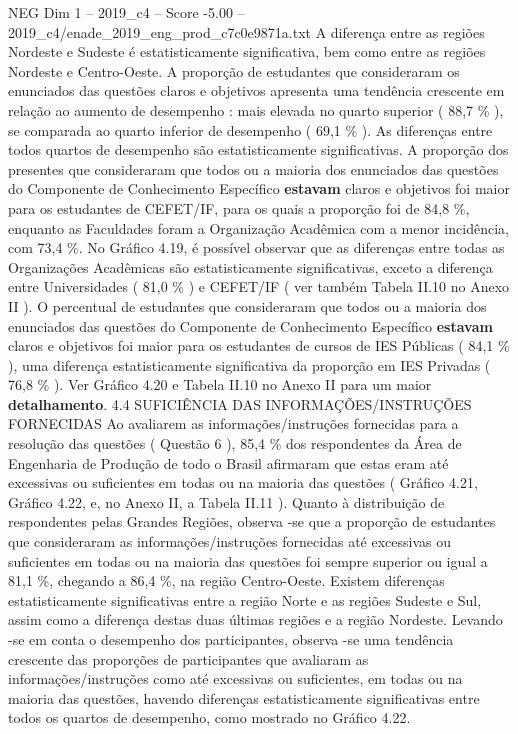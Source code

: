 \begin{textsample}{NEG Dim 1 – 2019\_c4 – Score -5.00 – 2019\_c4/enade\_2019\_eng\_prod\_c7c0e9871a.txt}
A diferença entre as regiões Nordeste e Sudeste é estatisticamente significativa, bem como entre as regiões Nordeste e Centro-Oeste.
A proporção de estudantes que consideraram os enunciados das questões claros e objetivos apresenta uma tendência crescente em relação ao aumento de desempenho : mais elevada no quarto superior ( 88,7 \% ), se comparada ao quarto inferior de desempenho ( 69,1 \% ).
As diferenças entre todos quartos de desempenho são estatisticamente significativas.
A proporção dos presentes que consideraram que todos ou a maioria dos enunciados das questões do Componente de Conhecimento Específico \textbf{estavam} claros e objetivos foi maior para os estudantes de CEFET/IF, para os quais a proporção foi de 84,8 \%, enquanto as Faculdades foram a Organização Acadêmica com a menor incidência, com 73,4 \%.
No Gráfico 4.19, é possível observar que as diferenças entre todas as Organizações Acadêmicas são estatisticamente significativas, exceto a diferença entre Universidades ( 81,0 \% ) e CEFET/IF ( ver também Tabela II.10 no Anexo II ).
O percentual de estudantes que consideraram que todos ou a maioria dos enunciados das questões do Componente de Conhecimento Específico \textbf{estavam} claros e objetivos foi maior para os estudantes de cursos de IES Públicas ( 84,1 \% ), uma diferença estatisticamente significativa da proporção em IES Privadas ( 76,8 \% ).
Ver Gráfico 4.20 e Tabela II.10 no Anexo II para um maior \textbf{detalhamento}. 4.4 SUFICIÊNCIA DAS INFORMAÇÕES/INSTRUÇÕES FORNECIDAS Ao avaliarem as informações/instruções fornecidas para a resolução das questões ( Questão 6 ), 85,4 \% dos respondentes da Área de Engenharia de Produção de todo o Brasil afirmaram que estas eram até excessivas ou suficientes em todas ou na maioria das questões ( Gráfico 4.21, Gráfico 4.22, e, no Anexo II, a Tabela II.11 ).
Quanto à distribuição de respondentes pelas Grandes Regiões, observa -se que a proporção de estudantes que consideraram as informações/instruções fornecidas até excessivas ou suficientes em todas ou na maioria das questões foi sempre superior ou igual a 81,1 \%, chegando a 86,4 \%, na região Centro-Oeste.
Existem diferenças estatisticamente significativas entre a região Norte e as regiões Sudeste e Sul, assim como a diferença destas duas últimas regiões e a região Nordeste.
Levando -se em conta o desempenho dos participantes, observa -se uma tendência crescente das proporções de participantes que avaliaram as informações/instruções como até excessivas ou suficientes, em todas ou na maioria das questões, havendo diferenças estatisticamente significativas entre todos os quartos de desempenho, como mostrado no Gráfico 4.22.

\end{textsample}
